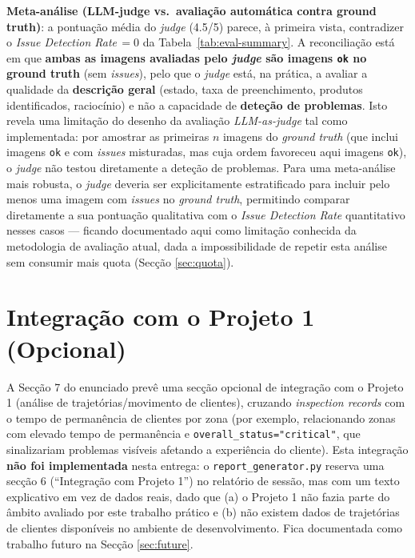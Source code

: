 \documentclass[conference]{IEEEtran}
\begin{document}
\textbf{Meta-análise (LLM-judge vs.\ avaliação automática contra ground
truth)}: a pontuação média do \textit{judge} (4.5/5) parece, à primeira
vista, contradizer o \textit{Issue Detection Rate}\,$=0$ da
Tabela~\ref{tab:eval-summary}. A reconciliação está em que \textbf{ambas as
imagens avaliadas pelo \textit{judge} são imagens \texttt{ok} no ground
truth} (sem \textit{issues}), pelo que o \textit{judge} está, na prática, a
avaliar a qualidade da \textbf{descrição geral} (estado, taxa de
preenchimento, produtos identificados, raciocínio) e não a capacidade de
\textbf{deteção de problemas}. Isto revela uma limitação do desenho da
avaliação \textit{LLM-as-judge} tal como implementada: por amostrar as
primeiras $n$ imagens do \textit{ground truth} (que inclui imagens
\texttt{ok} e com \textit{issues} misturadas, mas cuja ordem favoreceu aqui
imagens \texttt{ok}), o \textit{judge} não testou diretamente a deteção de
problemas. Para uma meta-análise mais robusta, o \textit{judge} deveria ser
explicitamente estratificado para incluir pelo menos uma imagem com
\textit{issues} no \textit{ground truth}, permitindo comparar diretamente a
sua pontuação qualitativa com o \textit{Issue Detection Rate} quantitativo
nesses casos --- ficando documentado aqui como limitação conhecida da
metodologia de avaliação atual, dada a impossibilidade de repetir esta
análise sem consumir mais quota (Secção \ref{sec:quota}).

\section{Integração com o Projeto 1 (Opcional)}
\label{sec:integration}

A Secção 7 do enunciado prevê uma secção opcional de integração com o
Projeto 1 (análise de trajetórias/movimento de clientes), cruzando
\textit{inspection records} com o tempo de permanência de clientes por zona
(por exemplo, relacionando zonas com elevado tempo de permanência e
\texttt{overall\_status="critical"}, que sinalizariam problemas visíveis
afetando a experiência do cliente). Esta integração \textbf{não foi
implementada} nesta entrega: o \texttt{report\_generator.py} reserva uma
secção 6 (``Integração com Projeto 1'') no relatório de sessão, mas com um
texto explicativo em vez de dados reais, dado que (a) o Projeto 1 não fazia
parte do âmbito avaliado por este trabalho prático e (b) não existem dados
de trajetórias de clientes disponíveis no ambiente de desenvolvimento. Fica
documentada como trabalho futuro na Secção \ref{sec:future}.
\end{document}
